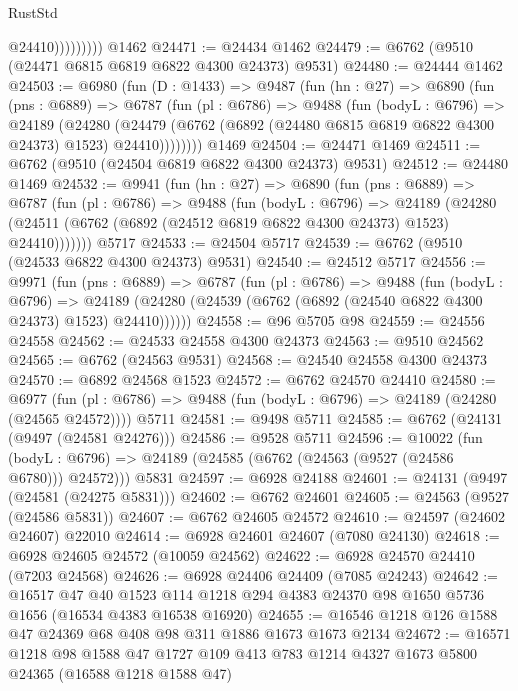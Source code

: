 \begin{lexlean}{RustStd}
\begin{coremodule}
                      @24410)))))))))
    @1462
@24471 := @24434 @1462
@24479 := @6762 (@9510 (@24471 @6815 @6819 @6822 @4300 @24373) @9531)
@24480 := @24444 @1462
@24503 := @6980
    (fun (D : @1433) =>
    @9487
      (fun (hn : @27) =>
      @6890
        (fun (pns : @6889) =>
        @6787
          (fun (pl : @6786) =>
          @9488
            (fun (bodyL : @6796) =>
            @24189
              (@24280
                (@24479 (@6762 (@6892 (@24480 @6815 @6819 @6822 @4300 @24373) @1523) @24410))))))))
    @1469
@24504 := @24471 @1469
@24511 := @6762 (@9510 (@24504 @6819 @6822 @4300 @24373) @9531)
@24512 := @24480 @1469
@24532 := @9941
    (fun (hn : @27) =>
    @6890
      (fun (pns : @6889) =>
      @6787
        (fun (pl : @6786) =>
        @9488
          (fun (bodyL : @6796) =>
          @24189
            (@24280 (@24511 (@6762 (@6892 (@24512 @6819 @6822 @4300 @24373) @1523) @24410)))))))
    @5717
@24533 := @24504 @5717
@24539 := @6762 (@9510 (@24533 @6822 @4300 @24373) @9531)
@24540 := @24512 @5717
@24556 := @9971
    (fun (pns : @6889) =>
    @6787
      (fun (pl : @6786) =>
      @9488
        (fun (bodyL : @6796) =>
        @24189 (@24280 (@24539 (@6762 (@6892 (@24540 @6822 @4300 @24373) @1523) @24410))))))
@24558 := @96 @5705 @98
@24559 := @24556 @24558
@24562 := @24533 @24558 @4300 @24373
@24563 := @9510 @24562
@24565 := @6762 (@24563 @9531)
@24568 := @24540 @24558 @4300 @24373
@24570 := @6892 @24568 @1523
@24572 := @6762 @24570 @24410
@24580 := @6977
    (fun (pl : @6786) => @9488 (fun (bodyL : @6796) => @24189 (@24280 (@24565 @24572))))
    @5711
@24581 := @9498 @5711
@24585 := @6762 (@24131 (@9497 (@24581 @24276)))
@24586 := @9528 @5711
@24596 := @10022
    (fun (bodyL : @6796) => @24189 (@24585 (@6762 (@24563 (@9527 (@24586 @6780))) @24572)))
    @5831
@24597 := @6928 @24188
@24601 := @24131 (@9497 (@24581 (@24275 @5831)))
@24602 := @6762 @24601
@24605 := @24563 (@9527 (@24586 @5831))
@24607 := @6762 @24605 @24572
@24610 := @24597 (@24602 @24607) @22010
@24614 := @6928 @24601 @24607 (@7080 @24130)
@24618 := @6928 @24605 @24572 (@10059 @24562)
@24622 := @6928 @24570 @24410 (@7203 @24568)
@24626 := @6928 @24406 @24409 (@7085 @24243)
@24642 := @16517
    @47
    @40
    @1523
    @114
    @1218
    @294
    @4383
    @24370
    @98
    @1650
    @5736
    @1656
    (@16534 @4383 @16538 @16920)
@24655 := @16546 @1218 @126 @1588 @47 @24369 @68 @408 @98 @311 @1886 @1673 @1673 @2134
@24672 := @16571
    @1218
    @98
    @1588
    @47
    @1727
    @109
    @413
    @783
    @1214
    @4327
    @1673
    @5800
    @24365
    (@16588 @1218 @1588 @47)

\end{coremodule}
\end{lexlean}
